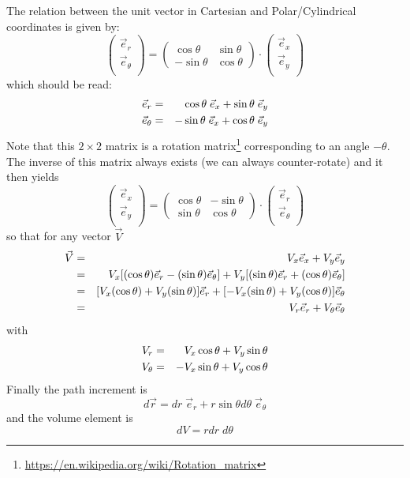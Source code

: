 \noindent The relation between the unit vector in Cartesian and Polar/Cylindrical coordinates
is given by:
\[
\left(
\begin{array}{c}
{\vec e}_{r} \\
{\vec e}_{\theta} \\
\end{array}
\right)
=
\left(
\begin{array}{cc}
\cos \theta & \sin \theta \\
-\sin \theta & \cos \theta
\end{array}
\right)
\cdot
\left(
\begin{array}{c}
{\vec e}_{x} \\
{\vec e}_{y} \\
\end{array}
\right)
\]
which should be read:
\begin{eqnarray}
{\vec e}_{r}      &=& \cos\theta \; {\vec e}_{x} + \sin\theta \;  {\vec e}_{y} \nonumber\\
{\vec e}_{\theta} &=& -\sin\theta \; {\vec e}_{x} + \cos\theta \;  {\vec e}_{y} 
\end{eqnarray}
Note that this $2\times 2$ matrix is a 
rotation matrix\footnote{\url{https://en.wikipedia.org/wiki/Rotation_matrix}}
corresponding to an angle $-\theta$. The inverse of this matrix always exists 
(we can always counter-rotate) and it then yields
\[
\left(
\begin{array}{c}
{\vec e}_{x} \\
{\vec e}_{y} \\
\end{array}
\right)
=
\left(
\begin{array}{cc}
\cos \theta & -\sin \theta \\
\sin \theta & \cos \theta
\end{array}
\right)
\cdot
\left(
\begin{array}{c}
{\vec e}_{r} \\
{\vec e}_{\theta} \\
\end{array}
\right)
\]
so that for any vector ${\vec V}$
\begin{eqnarray}
{\vec V} 
&=& V_x {\vec e}_x  + V_y {\vec e}_y \nonumber\\
&=& V_x [(\cos \theta) {\vec e}_r - (\sin \theta) {\vec e}_\theta]  + 
    V_y [(\sin \theta) {\vec e}_r + (\cos \theta){\vec e}_\theta] \nonumber\\
&=& [V_x (\cos \theta) + V_y (\sin \theta)] {\vec e}_r +
[- V_x(\sin \theta) + V_y (\cos \theta)]{\vec e}_\theta \nonumber\\
&=& V_r \vec{e}_r  + V_\theta \vec{e}_\theta \nonumber
\end{eqnarray}
with
\begin{eqnarray}
V_r &=& V_x \cos \theta + V_y \sin \theta \nonumber\\
V_\theta &=& - V_x \sin \theta + V_y \cos \theta \nonumber
\end{eqnarray}
Finally the path increment is
\[
d\vec{r} = dr \; {\vec e}_r  + r \sin\theta d\theta \; {\vec e}_\theta
\]
and the volume element is 
\[
dV= r dr \; d\theta
\]

